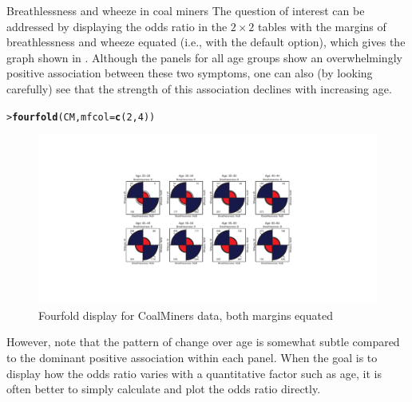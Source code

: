 \documentclass[10pt,krantz2]{krantz}\usepackage[]{graphicx}\usepackage[]{color}
\makeatletter
\newcommand{\hlnum}[1]{\textcolor[rgb]{0.686,0.059,0.569}{#1}}%
\newcommand{\hlstd}[1]{\textcolor[rgb]{0.345,0.345,0.345}{#1}}%
\newcommand{\hlkwc}[1]{\textcolor[rgb]{0.333,0.667,0.333}{#1}}%
\newcommand{\hlkwd}[1]{\textcolor[rgb]{0.737,0.353,0.396}{\textbf{#1}}}%
\newenvironment{kframe}{%
 \def\at@end@of@kframe{}%
 \ifinner\ifhmode%
  \def\at@end@of@kframe{\end{minipage}}%
  \begin{minipage}{\columnwidth}%
 \fi\fi%
 \def\FrameCommand##1{\hskip\@totalleftmargin \hskip-\fboxsep
 \colorbox{shadecolor}{##1}\hskip-\fboxsep
     \hskip-\linewidth \hskip-\@totalleftmargin \hskip\columnwidth}%
 \MakeFramed {\advance\hsize-\width
   \@totalleftmargin\z@ \linewidth\hsize
   \@setminipage}}%
 {\par\unskip\endMakeFramed%
 \at@end@of@kframe}
\newenvironment{knitrout}{}{} %
\renewenvironment{knitrout}{\small\renewcommand{\baselinestretch}{.85}}{} %
\makeatother
\begin{document}
\begin{Example}[wheeze1]{Breathlessness and wheeze in coal miners}
The question of interest
can be addressed by displaying the odds ratio
in the $2 \times 2$ tables with the margins of breathlessness
and wheeze equated (i.e., with the default  option),
which gives the graph shown in .
Although the panels for all age groups show an overwhelmingly
positive association between these two symptoms, one can also
(by looking carefully)
see that the strength of this association declines with increasing
age.

\begin{knitrout}
\color{fgcolor}\begin{kframe}
\begin{alltt}
\hlstd{> }\hlkwd{fourfold}\hlstd{(CM,} \hlkwc{mfcol} \hlstd{=} \hlkwd{c}\hlstd{(}\hlnum{2}\hlstd{,} \hlnum{4}\hlstd{))}
\end{alltt}
\end{kframe}\begin{figure}[!htbp]

\centerline{\includegraphics[width=\textwidth,trim=120 80 120 80]{ch04/fig/coalminer1-1} }

\caption[Fourfold display for CoalMiners data, both margins equated]{Fourfold display for CoalMiners data, both margins equated}\label{fig:coalminer1}
\end{figure}


\end{knitrout}

However, note that the pattern of change over age is somewhat subtle
compared to the dominant positive association within each
panel.
When the goal is to display how the odds ratio varies with
a quantitative factor such as age, it is often better to simply
calculate and plot the odds ratio directly.


\end{Example}
\end{document}
